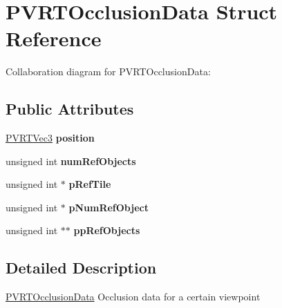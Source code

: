 \hypertarget{struct_p_v_r_t_occlusion_data}{\section{P\+V\+R\+T\+Occlusion\+Data Struct Reference}
\label{struct_p_v_r_t_occlusion_data}
}


Collaboration diagram for P\+V\+R\+T\+Occlusion\+Data\+:
\subsection*{Public Attributes}
\begin{DoxyCompactItemize}
\item 
\hypertarget{struct_p_v_r_t_occlusion_data_a4bfe1635d8fa35a063126a1133a21e21}{\hyperlink{struct_p_v_r_t_vec3}{P\+V\+R\+T\+Vec3} {\bfseries position}}\label{struct_p_v_r_t_occlusion_data_a4bfe1635d8fa35a063126a1133a21e21}

\item 
\hypertarget{struct_p_v_r_t_occlusion_data_a29ca4d13b4625b6d7d0b3c0b688ed829}{unsigned int {\bfseries num\+Ref\+Objects}}\label{struct_p_v_r_t_occlusion_data_a29ca4d13b4625b6d7d0b3c0b688ed829}

\item 
\hypertarget{struct_p_v_r_t_occlusion_data_a2d7852957df4a69081c7dc33561c0e24}{unsigned int $\ast$ {\bfseries p\+Ref\+Tile}}\label{struct_p_v_r_t_occlusion_data_a2d7852957df4a69081c7dc33561c0e24}

\item 
\hypertarget{struct_p_v_r_t_occlusion_data_a7736e4e1644f48218fbd42d91fff56ea}{unsigned int $\ast$ {\bfseries p\+Num\+Ref\+Object}}\label{struct_p_v_r_t_occlusion_data_a7736e4e1644f48218fbd42d91fff56ea}

\item 
\hypertarget{struct_p_v_r_t_occlusion_data_a7b29628db124b437cd9d8fbd8a5e7d32}{unsigned int $\ast$$\ast$ {\bfseries pp\+Ref\+Objects}}\label{struct_p_v_r_t_occlusion_data_a7b29628db124b437cd9d8fbd8a5e7d32}

\end{DoxyCompactItemize}


\subsection{Detailed Description}


  \hyperlink{struct_p_v_r_t_occlusion_data}{P\+V\+R\+T\+Occlusion\+Data}  Occlusion data for a certain viewpoint



